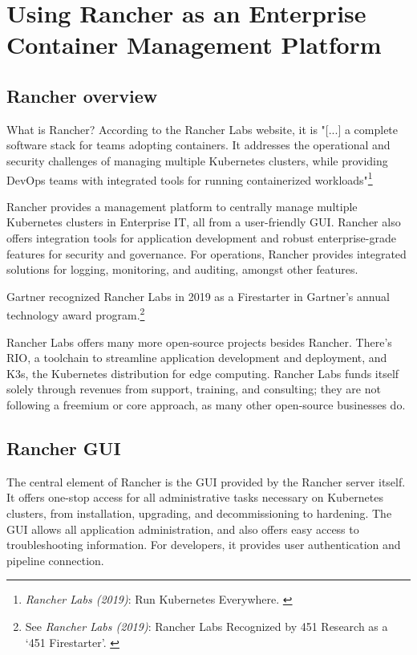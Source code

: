 %
%

\pagebreak
\section{Using Rancher as an Enterprise Container Management Platform}

\onehalfspacing

\subsection{Rancher overview}

What is Rancher? According to the Rancher Labs website, it is "[...] a complete software stack for teams adopting containers. It addresses the operational and security challenges of managing multiple Kubernetes clusters, while providing DevOps teams with integrated tools for running containerized workloads"\footnote{\textit{Rancher Labs (2019)}: Run Kubernetes Everywhere. \cite{rancher}}

Rancher provides a management platform to centrally manage multiple Kubernetes clusters in Enterprise IT, all from a user-friendly GUI. Rancher also offers integration tools for application development and robust enterprise-grade features for security and governance. For operations, Rancher provides integrated solutions for logging, monitoring, and auditing, amongst other features.

Gartner recognized Rancher Labs in 2019 as a Firestarter in Gartner's annual technology award program.\footnote{See \textit{Rancher Labs (2019)}: Rancher Labs Recognized by 451 Research as a ‘451 Firestarter’. \cite{firestarter451}}

Rancher Labs offers many more open-source projects besides Rancher. There's RIO, a toolchain to streamline application development and deployment, and K3s, the Kubernetes distribution for edge computing. Rancher Labs funds itself solely through revenues from support, training, and consulting; they are not following a freemium or core approach, as many other open-source businesses do.

\subsection{Rancher GUI}

The central element of Rancher is the GUI provided by the Rancher server itself. It offers one-stop access for all administrative tasks necessary on Kubernetes clusters, from installation, upgrading, and decommissioning to hardening. The GUI allows all application administration, and also offers easy access to troubleshooting information. For developers, it provides user authentication and pipeline connection.

